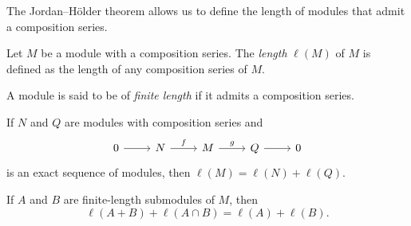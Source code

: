 The Jordan--H\"older theorem allows us to define the 
length of modules that admit a composition series. 

\begin{definition}
    Let $M$ be a module with a composition series. 
    The \emph{length} $\ell(M)$ of $M$ is defined as the length of any composition series of $M$. 
\end{definition}

A module is said to be of 
\emph{finite length} if it admits a composition series. 

\begin{exercise}
	If $N$ and $Q$ are modules with composition series and  
	\[
	\begin{tikzcd}
		0 \arrow[r]
		& N \arrow{r}{f}
		& M \arrow{r}{g}
		& Q \arrow[r]
		& 0
	\end{tikzcd}
	\]
	is an exact sequence of modules, then $\ell(M)=\ell(N)+\ell(Q)$.
\end{exercise}


\begin{xca}
	If $A$ and $B$ are finite-length submodules of $M$, then  
	\[
	\ell(A+B)+\ell(A\cap B)=\ell(A)+\ell(B).
	\]
\end{xca}

